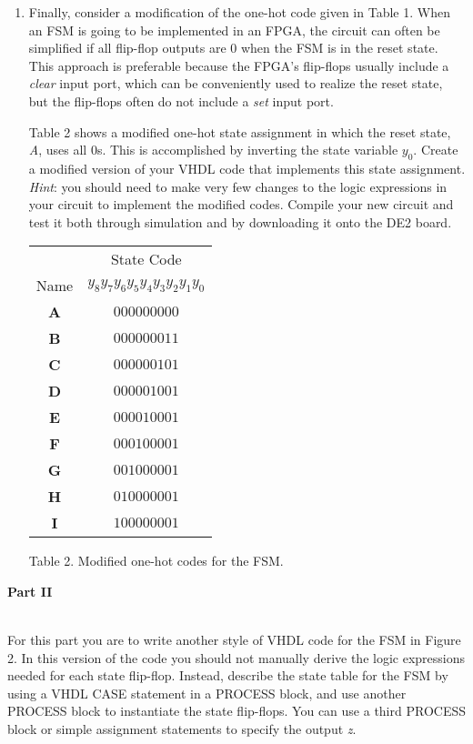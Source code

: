 \documentclass[epsfig,10pt,fullpage]{article}
\begin{document}
\begin{enumerate}
\item Finally, consider
a modification of the one-hot code given in Table 1. When an FSM is going to be
implemented in an FPGA, the circuit can often be simplified if all flip-flop
outputs are 0 when the FSM is in the reset state. This approach is preferable because the
FPGA's flip-flops usually include a {\it clear} input port, which can be conveniently
used to realize the reset state, but the flip-flops often do not include a {\it set} input port.

\newpage
Table 2 shows a modified one-hot state assignment in which the reset state, {\it A}, 
uses all 0s. This is accomplished by inverting the state variable $y_0$. 
Create a modified version of your VHDL code that implements this state
assignment. {\it Hint}: you should need to make very few changes to the logic expressions
in your circuit to implement the modified codes. Compile your new circuit and test it both
through simulation and by downloading it onto the DE2 board.

\begin{center}
\begin{tabular}{c|c}
~ & State Code \\ 
Name & $y_8 y_7 y_6 y_5 y_4 y_3 y_2 y_1 y_0$ \\ \hline
\rule[-0.075in]{0in}{0.25in}{\bf A} & $000000000$ \\ 
{\bf B} & $000000011$ \\ 
{\bf C} & $000000101$ \\ 
{\bf D} & $000001001$ \\ 
{\bf E} & $000010001$ \\ 
{\bf F} & $000100001$ \\ 
{\bf G} & $001000001$ \\ 
{\bf H} & $010000001$ \\ 
{\bf I} & $100000001$ \\ 
\end{tabular}
\end{center}

\begin{center}
Table 2. Modified one-hot codes for the FSM.
\end{center}

\end{enumerate}

\noindent
{\bf Part II}

~\\
\noindent
For this part you are to write another style of VHDL code for the FSM in Figure 2. In
this version of the code you should not manually derive the logic expressions needed for
each state flip-flop. Instead, describe the state table for the FSM by using a
VHDL CASE statement in a PROCESS block, and use another PROCESS block to
instantiate the state flip-flops. You can use a third PROCESS block or simple assignment
statements to specify the output {\it z}. 
\end{document}
